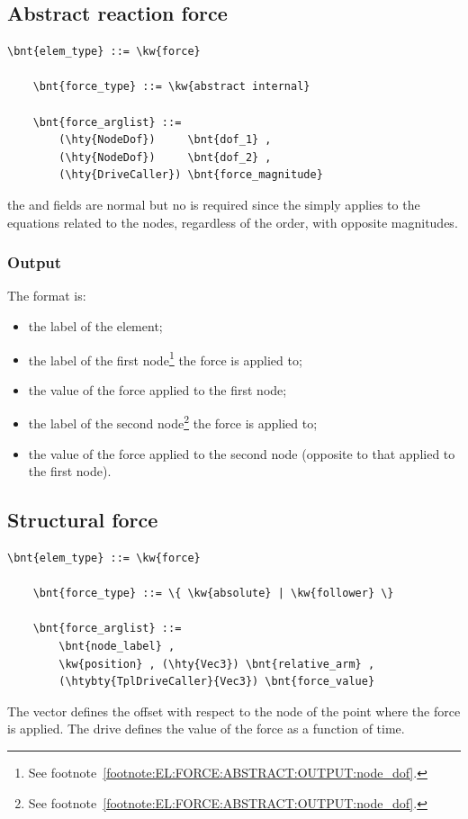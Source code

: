 \subsection{Abstract reaction force}
\begin{Verbatim}[commandchars=\\\{\}]
    \bnt{elem_type} ::= \kw{force}

    \bnt{force_type} ::= \kw{abstract internal}

    \bnt{force_arglist} ::=
        (\hty{NodeDof})     \bnt{dof_1} ,
        (\hty{NodeDof})     \bnt{dof_2} ,
        (\hty{DriveCaller}) \bnt{force_magnitude}
\end{Verbatim}
the  and  fields are normal 
but no  is required since the  simply applies
to the equations related to the nodes, regardless of the order, with
opposite magnitudes.

\subsubsection{Output}
The format is:
\begin{itemize}
    \item the label of the element;
    \item the label of the first node\footnote{See
	footnote~\ref{footnote:EL:FORCE:ABSTRACT:OUTPUT:node_dof}.}
	the force is applied to;
    \item the value of the force applied to the first node;
    \item the label of the second node\footnote{See
	footnote~\ref{footnote:EL:FORCE:ABSTRACT:OUTPUT:node_dof}.}
	the force is applied to;
    \item the value of the force applied to the second node
	  (opposite to that applied to the first node).
\end{itemize}

\subsection{Structural force}
\label{sec:EL:FORCE:STRUCTURAL:FORCE}
\begin{Verbatim}[commandchars=\\\{\}]
    \bnt{elem_type} ::= \kw{force}

    \bnt{force_type} ::= \{ \kw{absolute} | \kw{follower} \} 

    \bnt{force_arglist} ::=
        \bnt{node_label} , 
        \kw{position} , (\hty{Vec3}) \bnt{relative_arm} ,
        (\htybty{TplDriveCaller}{Vec3}) \bnt{force_value}
\end{Verbatim}
The vector  defines the offset with respect
to the node of the point where the force is applied.
The drive  defines the value of the force
as a function of time.

